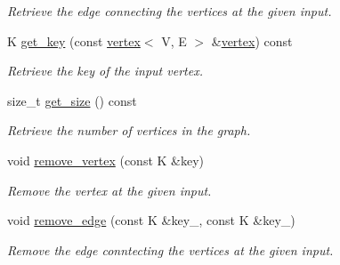 \begin{DoxyCompactItemize}
\begin{DoxyCompactList}\small\item\em Retrieve the edge connecting the vertices at the given input. \end{DoxyCompactList}\item 
K \hyperlink{classdynamic__sparse__graph_a99591a4ba35e3ab63df0db306fa70cfb}{get\+\_\+key} (const \hyperlink{structvertex}{vertex}$<$ V, E $>$ \&\hyperlink{structvertex}{vertex}) const 
\begin{DoxyCompactList}\small\item\em Retrieve the key of the input vertex. \end{DoxyCompactList}\item 
size\+\_\+t \hyperlink{classdynamic__sparse__graph_a0253cc8b89538ee083af8ceb375dc26e}{get\+\_\+size} () const 
\begin{DoxyCompactList}\small\item\em Retrieve the number of vertices in the graph. \end{DoxyCompactList}\item 
void \hyperlink{classdynamic__sparse__graph_a05e7f038016167d47560f7e8b1d53ec3}{remove\+\_\+vertex} (const K \&key)
\begin{DoxyCompactList}\small\item\em Remove the vertex at the given input. \end{DoxyCompactList}\item 
void \hyperlink{classdynamic__sparse__graph_a5e377f2d740acef43e1528041b94e52d}{remove\+\_\+edge} (const K \&key\+\_, const K \&key\+\_)
\begin{DoxyCompactList}\small\item\em Remove the edge conntecting the vertices at the given input. \end{DoxyCompactList}\end{DoxyCompactItemize}
